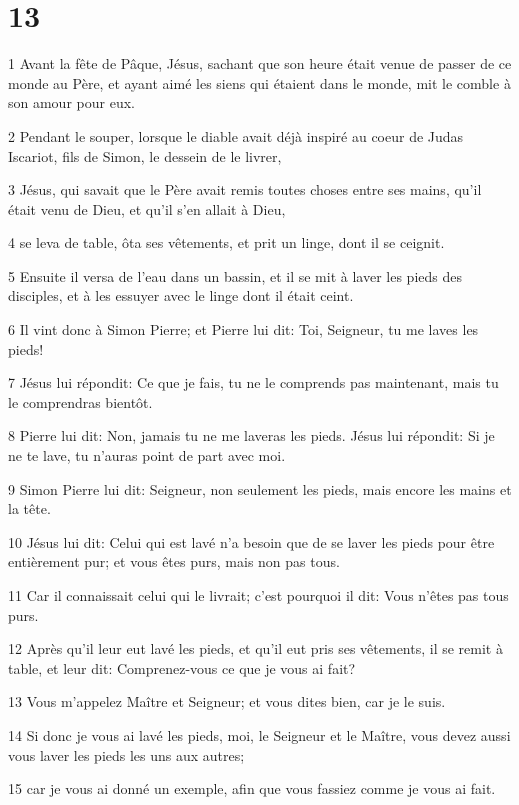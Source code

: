 \chapter{13}

\par 1 Avant la fête de Pâque, Jésus, sachant que son heure était venue de passer de ce monde au Père, et ayant aimé les siens qui étaient dans le monde, mit le comble à son amour pour eux.
\par 2 Pendant le souper, lorsque le diable avait déjà inspiré au coeur de Judas Iscariot, fils de Simon, le dessein de le livrer,
\par 3 Jésus, qui savait que le Père avait remis toutes choses entre ses mains, qu'il était venu de Dieu, et qu'il s'en allait à Dieu,
\par 4 se leva de table, ôta ses vêtements, et prit un linge, dont il se ceignit.
\par 5 Ensuite il versa de l'eau dans un bassin, et il se mit à laver les pieds des disciples, et à les essuyer avec le linge dont il était ceint.
\par 6 Il vint donc à Simon Pierre; et Pierre lui dit: Toi, Seigneur, tu me laves les pieds!
\par 7 Jésus lui répondit: Ce que je fais, tu ne le comprends pas maintenant, mais tu le comprendras bientôt.
\par 8 Pierre lui dit: Non, jamais tu ne me laveras les pieds. Jésus lui répondit: Si je ne te lave, tu n'auras point de part avec moi.
\par 9 Simon Pierre lui dit: Seigneur, non seulement les pieds, mais encore les mains et la tête.
\par 10 Jésus lui dit: Celui qui est lavé n'a besoin que de se laver les pieds pour être entièrement pur; et vous êtes purs, mais non pas tous.
\par 11 Car il connaissait celui qui le livrait; c'est pourquoi il dit: Vous n'êtes pas tous purs.
\par 12 Après qu'il leur eut lavé les pieds, et qu'il eut pris ses vêtements, il se remit à table, et leur dit: Comprenez-vous ce que je vous ai fait?
\par 13 Vous m'appelez Maître et Seigneur; et vous dites bien, car je le suis.
\par 14 Si donc je vous ai lavé les pieds, moi, le Seigneur et le Maître, vous devez aussi vous laver les pieds les uns aux autres;
\par 15 car je vous ai donné un exemple, afin que vous fassiez comme je vous ai fait.
